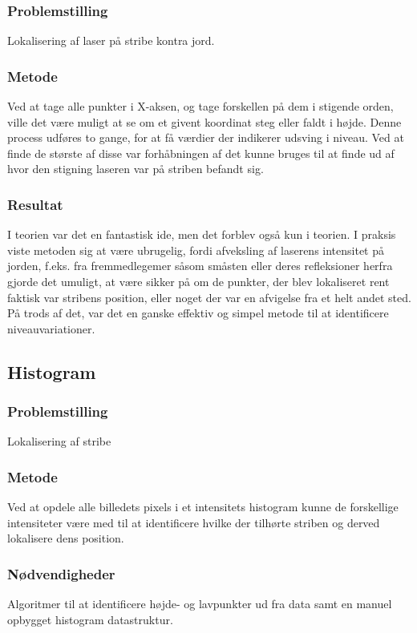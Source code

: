 \subsubsection{Problemstilling}
Lokalisering af laser på stribe kontra jord.

\subsubsection{Metode}
Ved at tage alle punkter i X-aksen, og tage forskellen på dem i stigende orden, ville det være muligt at se om et givent koordinat steg eller faldt i højde.
Denne process udføres to gange, for at få værdier der indikerer udsving i niveau. Ved at finde de største af disse var forhåbningen af det kunne bruges til at finde ud af hvor den stigning laseren var på striben befandt sig.

\subsubsection{Resultat}
I teorien var det en fantastisk ide, men det forblev også kun i teorien. I praksis viste metoden sig at være ubrugelig, fordi afveksling af laserens intensitet på jorden, f.eks. fra fremmedlegemer såsom småsten eller deres refleksioner herfra gjorde det umuligt, at være sikker på om de punkter, der blev lokaliseret rent faktisk var stribens position, eller noget der var en afvigelse fra et helt andet sted.
På trods af det, var det en ganske effektiv og simpel metode til at identificere niveauvariationer.

\subsection{Histogram}

\subsubsection{Problemstilling}
Lokalisering af stribe

\subsubsection{Metode}
Ved at opdele alle billedets pixels i et intensitets histogram kunne de forskellige intensiteter være med til at identificere hvilke der tilhørte striben og derved lokalisere dens position.

\subsubsection{Nødvendigheder}
Algoritmer til at identificere højde- og lavpunkter ud fra data samt en manuel opbygget histogram datastruktur.

